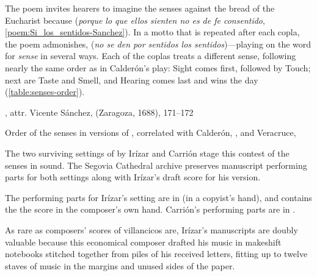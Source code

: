 The poem invites hearers to imagine the senses 
against the bread of the Eucharist because  (\emph{porque lo que ellos sienten no es de fe consentido},
\cref{poem:Si_los_sentidos-Sanchez}).%
    \Autocite[171--172]{Sanchez:LiraPoetica}
In a motto that is repeated after each copla, the poem admonishes,  (\emph{no se den por sentidos los sentidos})---playing
on the word for \emph{sense} in several ways.  
Each of the coplas treats a different sense, following nearly the same order as
in Calderón's play: Sight comes first, followed by Touch; next are Taste and
Smell, and Hearing comes last and wins the day (\cref{table:senses-order}).

\begin{poemexample}

    \caption{, attr. Vicente
    Sánchez,  (Zaragoza, 1688), 171--172}
    
    \label{poem:Si_los_sentidos-Sanchez}

\end{poemexample}

\begin{table}
    \caption{Order of the senses in versions of ,
    correlated with Calderón, , and
    Veracruce, } 
    
    \label{table:senses-order}

\end{table}

The two surviving settings of  by Irízar and Carrión
stage this contest of the senses in sound.
The Segovia Cathedral archive preserves manuscript performing parts for both
settings along with Irízar's draft score for his version.%
\begin{Footnote}
    The performing parts for Irízar's setting are in  (in a
    copyist's hand), and  contains the the score in the
    composer's own hand.
    Carrión's performing parts are in .
\end{Footnote}
As rare as composers' scores of villancicos are, Irízar's manuscripts are doubly
valuable because this economical composer drafted his music in makeshift
notebooks stitched together from piles of his received letters, fitting up to
twelve staves of music in the margins and unused sides of the paper.

